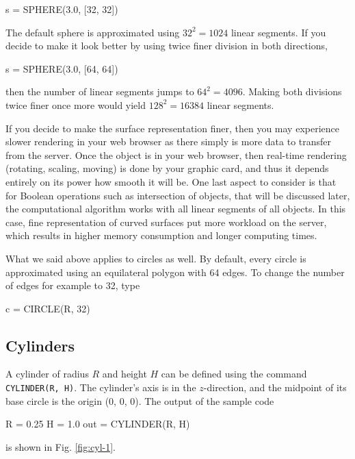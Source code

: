 \begin{bluecode}
s = SPHERE(3.0, [32, 32])
\end{bluecode}
The default sphere is approximated using $32^2 = 1024$ linear
segments. If you decide to make it look better by using 
twice finer division in both directions,

\begin{bluecode}
s = SPHERE(3.0, [64, 64])
\end{bluecode}
then the number of linear segments jumps to $64^2 = 4096$. Making 
both divisions twice finer once more would yield $128^2 = 16384$ linear
segments. 

If you decide to make the surface representation finer, then you may experience 
slower rendering in your web browser as there simply is more data 
to transfer from the server. Once the object is in your web browser,
then real-time rendering (rotating, scaling, moving) is done by your 
graphic card, and thus it depends entirely on its power how smooth
it will be. One last aspect to consider is that for Boolean operations 
such as intersection of objects, that will be discussed later, the 
computational algorithm works with all linear segments of all objects. 
In this case, fine representation of curved surfaces put more workload 
on the server, which results in higher memory consumption and longer 
computing times. 

What we said above applies to circles as well. By default, every circle 
is approximated using an equilateral polygon 
with 64 edges. To change the number of edges for example to 32, type

\begin{bluecode}
c = CIRCLE(R, 32)
\end{bluecode}

\subsection{Cylinders}

A cylinder of radius $R$ and height $H$ can be defined using 
the command {\tt CYLINDER(R, H)}. The cylinder's axis is in 
the $z$-direction, and the midpoint of its base circle is the 
origin (0, 0, 0). The output of the sample code

\begin{bluecode}
R = 0.25
H = 1.0
out = CYLINDER(R, H)
\end{bluecode}
is shown in Fig. \ref{fig:cyl-1}.

